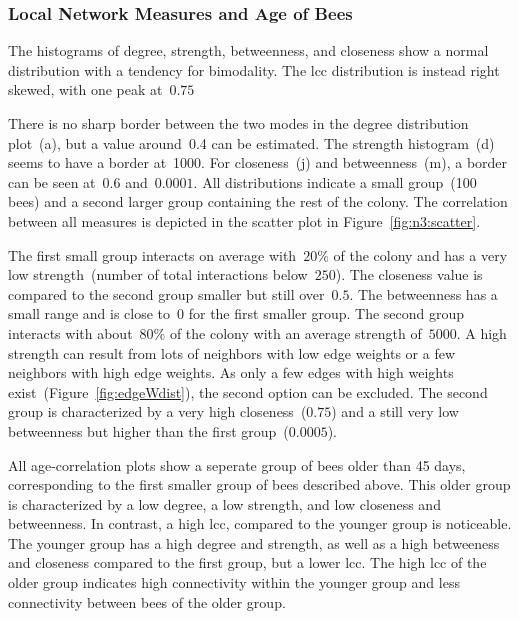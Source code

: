 \subsubsection{Local Network Measures and Age of Bees}
The histograms of degree, strength, betweenness, and closeness show a normal distribution with a tendency for bimodality. The lcc distribution is instead right skewed, with one peak at~$0.75$

There is no sharp border between the two modes in the degree distribution plot~(a), but a value around~0.4 can be estimated.
The strength histogram~(d) seems to have a border at~1000.
For closeness~(j) and betweenness~(m), a border can be seen at~$0.6$ and~$0.0001$.
All distributions indicate a small group~(100 bees) and a second larger group containing the rest of the colony.
The correlation between all measures is depicted in the scatter plot in Figure~\ref{fig:n3:scatter}.  

The first small group interacts on average with~$20\%$ of the colony and has a very low strength~(number of total interactions below~$250$).
The closeness value is compared to the second group smaller but still over~$0.5$.
The betweenness has a small range and is close to~$0$ for the first smaller group.
The second group interacts with about~$80\%$ of the colony with an average strength of~$5000$.
A high strength can result from lots of neighbors with low edge weights or a few neighbors with high edge weights.
As only a few edges with high weights exist~(Figure~\ref{fig:edgeWdist}), the second option can be excluded. The second group is characterized by a very high closeness~($0.75$) and a still very low betweenness but higher than the first group~($0.0005$).

All age-correlation plots show a seperate group of bees older than 45 days, corresponding to the first smaller group of bees described above.
This older group is characterized by a low degree, a low strength, and low closeness and betweenness.
In contrast, a high lcc, compared to the younger group is noticeable.
The younger group has a high degree and strength, as well as a high betweeness and closeness compared to the first group, but a lower lcc.
The high lcc of the older group indicates high connectivity within the younger group and less connectivity between bees of the older group.


